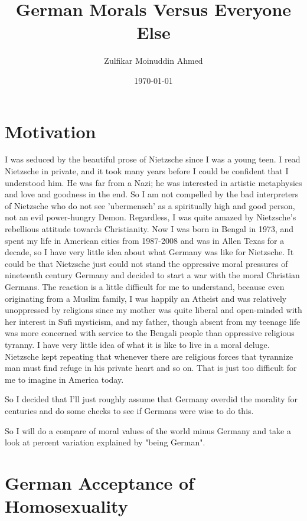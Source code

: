 \documentclass{amsart}
\title{German Morals Versus Everyone Else}
\author{Zulfikar Moinuddin Ahmed}
\date{\today}
\begin{document}
\maketitle


\section{Motivation}

I was seduced by the beautiful prose of Nietzsche since I was a young teen.  I read Nietzsche in private, and it took many years before I could be confident that I understood him.  He was far from a Nazi; he was interested in artistic metaphysics and love and goodness in the end.  So I am not compelled by the bad interpreters of Nietzsche who do not see 'ubermensch' as a spiritually high and good person, not an evil power-hungry Demon.  Regardless, I was quite amazed by Nietzsche's rebellious attitude towards Christianity.  Now I was born in Bengal in 1973, and spent my life in American cities from 1987-2008 and was in Allen Texas for a decade, so I have very little idea about what Germany was like for Nietzsche.  It could be that Nietzsche just could not stand the oppressive moral pressures of nineteenth century Germany and decided to start a war with the moral Christian Germans.  The reaction is a little difficult for me to understand, because even originating from a Muslim family, I was happily an Atheist and was relatively unoppressed by religions since my mother was quite liberal and open-minded with her interest in Sufi mysticism, and my father, though absent from my teenage life was more concerned with service to the Bengali people than oppressive religious tyranny.  I have very little idea of what it is like to live in a moral deluge.  Nietzsche kept repeating that whenever there are religious forces that tyrannize man must find refuge in his private heart and so on.  That is just too difficult for me to imagine in America today.  

So I decided that I'll just roughly assume that Germany overdid the morality for centuries and do some checks to see if Germans were wise to do this.  

So I will do a compare of moral values of the world minus Germany and take a look at percent variation explained by "being German".

\section{German Acceptance of Homosexuality}
\end{document}
